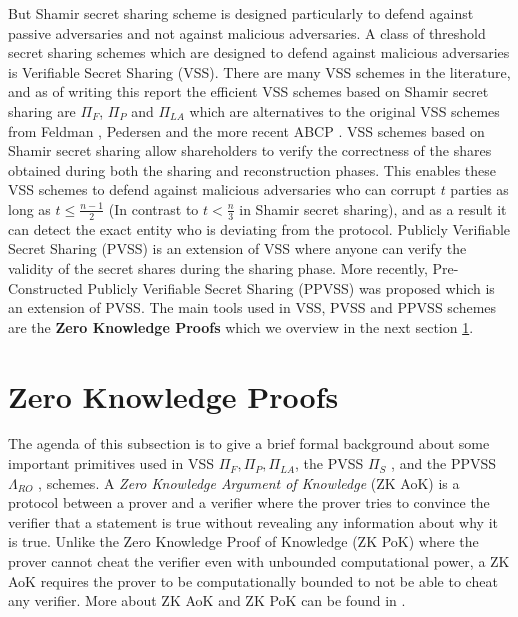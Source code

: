 But Shamir secret sharing scheme is designed particularly to defend against passive adversaries and not 
against malicious adversaries. A class of threshold secret sharing schemes which are designed to defend 
against malicious adversaries is Verifiable Secret Sharing (VSS). There are many VSS schemes in the literature, 
and as of writing this report the efficient VSS schemes based on Shamir secret sharing are $\Pi_F$, 
$\Pi_P$ and $\Pi_{LA}$ \cite{cryptoeprint:2023/1669} which are alternatives to the original VSS schemes 
from Feldman \cite{DBLP:conf/focs/Feldman87}, Pedersen \cite{crypto-1991-1671} and the more recent 
ABCP \cite{cryptoeprint:2023/992}. VSS schemes based on Shamir secret sharing allow shareholders to 
verify the correctness of the shares obtained during both the sharing and reconstruction phases. This enables 
these VSS schemes to defend against malicious adversaries who can corrupt $t$ parties as long as 
$t\leq\frac{n-1}{2}$ (In contrast to $t<\frac{n}{3}$ in Shamir secret sharing), and as a 
result it can detect the exact entity who is deviating from the protocol. Publicly Verifiable Secret Sharing (PVSS) is an extension of VSS where anyone can 
verify the validity of the secret shares during the sharing phase. More recently, Pre-Constructed Publicly 
Verifiable Secret Sharing (PPVSS)\cite{cryptoeprint:2025/576} was proposed which is an extension of PVSS. 
The main tools used in VSS, PVSS and PPVSS schemes are the \textbf{Zero Knowledge Proofs} which we overview in the 
next section \ref{sec:sigma-protocols}.

\section{Zero Knowledge Proofs}
\label{sec:sigma-protocols}
The agenda of this subsection is to give a brief formal background about some important primitives 
used in VSS $\Pi_{F},\Pi_{P},\Pi_{LA}$, the PVSS $\Pi_S$ \cite{cryptoeprint:2023/1669}, and the PPVSS $\Lambda_{RO}$ \cite{cryptoeprint:2025/576}, schemes. 
A \textit{Zero Knowledge Argument of Knowledge} (ZK AoK) is a protocol between a prover and a verifier
where the prover tries to convince the verifier that a statement is true without revealing any information 
about why it is true. Unlike the Zero Knowledge Proof of Knowledge (ZK PoK) where the prover cannot cheat 
the verifier even with unbounded computational power, a ZK AoK requires the prover to be computationally bounded 
to not be able to cheat any verifier. More about ZK AoK and ZK PoK can be found in \cite{cryptoeprint:2017/1066}.\par

